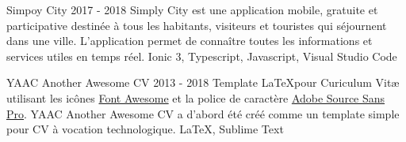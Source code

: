 %
%
%


\begin{projects}
	\project
	{Simpoy City}
	{2017 - 2018}
	{
	}
	{
		Simply City est une application mobile, gratuite et
		participative destinée à tous les habitants, visiteurs et touristes qui
		séjournent dans une ville. L’application permet de connaître toutes les
		informations et services utiles en temps réel.
	}
	{
		Ionic 3,
		Typescript,
		Javascript,
		Visual Studio Code
	}

	\project
	{YAAC Another Awesome CV}
	{2013 - 2018}
	{
	}
	{
		Template \LaTeX pour Curiculum Vitæ utilisant les icônes
		\href{https://fontawesome.com}{Font Awesome} et la police de caractère
		\href{https://fonts.google.com/specimen/Source+Sans+Pro}{Adobe Source Sans Pro}.
		YAAC Another Awesome CV a d'abord été créé comme un template simple
		pour CV à vocation technologique.
	}
	{
		\LaTeX,
		Sublime Text
	}
\end{projects}

